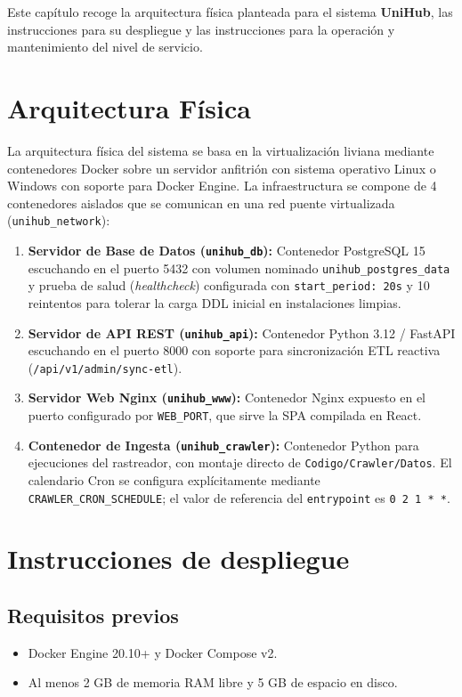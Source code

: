 Este capítulo recoge la arquitectura física planteada para el sistema \textbf{UniHub}, las instrucciones para su despliegue y las instrucciones para la operación y mantenimiento del nivel de servicio.

\section{Arquitectura Física}
La arquitectura física del sistema se basa en la virtualización liviana mediante contenedores Docker sobre un servidor anfitrión con sistema operativo Linux o Windows con soporte para Docker Engine. La infraestructura se compone de 4 contenedores aislados que se comunican en una red puente virtualizada (\texttt{unihub\_network}):
\begin{enumerate}
    \item \textbf{Servidor de Base de Datos (\texttt{unihub\_db}):} Contenedor PostgreSQL 15 escuchando en el puerto 5432 con volumen nominado \texttt{unihub\_postgres\_data} y prueba de salud (\emph{healthcheck}) configurada con \texttt{start\_period: 20s} y 10 reintentos para tolerar la carga DDL inicial en instalaciones limpias.
    \item \textbf{Servidor de API REST (\texttt{unihub\_api}):} Contenedor Python 3.12 / FastAPI escuchando en el puerto 8000 con soporte para sincronización ETL reactiva (\texttt{/api/v1/admin/sync-etl}).
    \item \textbf{Servidor Web Nginx (\texttt{unihub\_www}):} Contenedor Nginx expuesto en el puerto configurado por \texttt{WEB\_PORT}, que sirve la SPA compilada en React.
    \item \textbf{Contenedor de Ingesta (\texttt{unihub\_crawler}):} Contenedor Python para ejecuciones del rastreador, con montaje directo de \texttt{Codigo/Crawler/Datos}. El calendario Cron se configura explícitamente mediante \texttt{CRAWLER\_CRON\_SCHEDULE}; el valor de referencia del \texttt{entrypoint} es \texttt{0 2 1 * *}.
\end{enumerate}

\section{Instrucciones de despliegue}

\subsection{Requisitos previos}
\begin{itemize}
    \item Docker Engine 20.10+ y Docker Compose v2.
    \item Al menos 2 GB de memoria RAM libre y 5 GB de espacio en disco.
\end{itemize}

